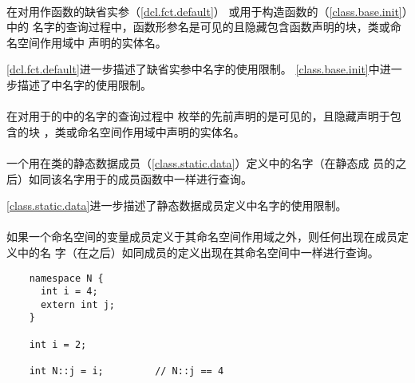 \paragraph{} %
在对用作函数的缺省实参（\ref{dcl.fct.default}）
或用于构造函数的（\ref{class.base.init}）中的
名字的查询过程中，函数形参名是可见的且隐藏包含函数声明的块，类或命名空间作用域中
声明的实体名。

\begin{note}
  \ref{dcl.fct.default}进一步描述了缺省实参中名字的使用限制。
  \ref{class.base.init}中进一步描述了中名字的使用限制。
\end{note}

\paragraph{} %
在对用于的中的名字的查询过程中
枚举的先前声明的是可见的，且隐藏声明于包含的块
，类或命名空间作用域中声明的实体名。

\paragraph{} %
一个用在类的静态数据成员（\ref{class.static.data}）定义中的名字（在静态成
员的之后）如同该名字用于的成员函数中一样进行查询。

\begin{note}
  \ref{class.static.data}进一步描述了静态数据成员定义中名字的使用限制。
\end{note}

\paragraph{} %
如果一个命名空间的变量成员定义于其命名空间作用域之外，则任何出现在成员定义中的名
字（在之后）如同成员的定义出现在其命名空间中一样进行查询。

\begin{example}
  \begin{lstlisting}
    namespace N {
      int i = 4;
      extern int j;
    }

    int i = 2;

    int N::j = i;         // N::j == 4
  \end{lstlisting}
\end{example}

